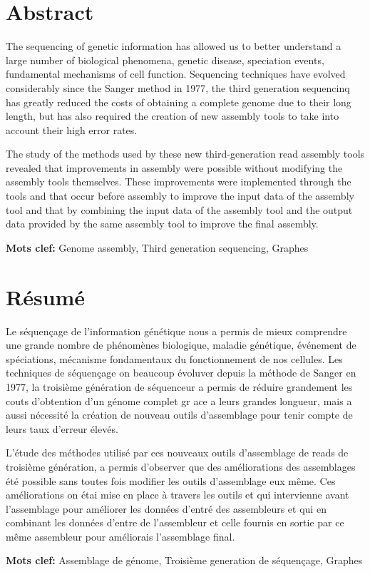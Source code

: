 \documentclass[main.tex]{subfiles}
\begin{document}
\pagestyle{empty}

\section*{Abstract}

The sequencing of genetic information has allowed us to better understand a large number of biological phenomena, genetic disease, speciation events, fundamental mechanisms of cell function. Sequencing techniques have evolved considerably since the Sanger method in 1977, the third generation sequencinq has greatly reduced the costs of obtaining a complete genome due to their long length, but has also required the creation of new assembly tools to take into account their high error rates.

The study of the methods used by these new third-generation read assembly tools revealed that improvements in assembly were possible without modifying the assembly tools themselves. These improvements were implemented through the tools \yacrd and \fpa that occur before assembly to improve the input data of the assembly tool and \knot that by combining the input data of the assembly tool and the output data provided by the same assembly tool to improve the final assembly.

\textbf{Mots clef:} Genome assembly, Third generation sequencing, Graphes

\section*{Résumé}

Le séquençage de l'information génétique nous a permis de mieux comprendre une grande nombre de phénomènes biologique, maladie génétique, événement de spéciations, mécanisme fondamentaux du fonctionnement de nos cellules. Les techniques de séquençage on beaucoup évoluver depuis la méthode de Sanger en 1977, la troisième génération de séquenceur a permis de réduire grandement les couts d'obtention d'un génome complet gr ace a leurs grandes longueur, mais a aussi nécessité la création de nouveau outils d'assemblage pour tenir compte de leurs taux d'erreur élevés.

L'étude des méthodes utilisé par ces nouveaux outils d'assemblage de reads de troisième génération, a permis d'observer que des améliorations des assemblages été possible sans toutes fois modifier les outils d'assemblage eux même. Ces améliorations on étai mise en place à travers les outils \yacrd et \fpa qui intervienne avant l'assemblage pour améliorer les données d'entré des assembleurs et \knot qui en combinant les données d'entre de l'assembleur et celle fournis en sortie par ce même assembleur pour améliorais l'assemblage final.

\textbf{Mots clef:} Assemblage de génome, Troisième generation de séquençage, Graphes
\end{document}
